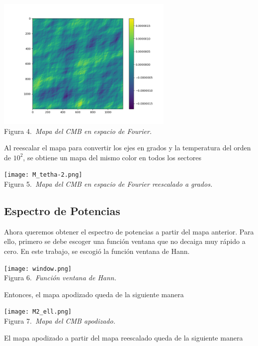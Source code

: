 \documentclass[twocolumn,letterpaper,spanish]{revtex4}
\numberwithin{equation}{section}
\begin{document}
\begin{center}
   \includegraphics[width=85mm]{M_tetha.png}\\
   Figura 4.\emph{\ Mapa del CMB en espacio de Fourier.}
\end{center}

Al reescalar el mapa para convertir los ejes en grados y la temperatura del orden de $10^2$, se obtiene un mapa del mismo color en todos los sectores

\begin{center}
   \texttt{[image: M\_tetha-2.png]}\\
   Figura 5.\emph{\ Mapa del CMB en espacio de Fourier reescalado a grados.}
\end{center}

\subsection{Espectro de Potencias}

Ahora queremos obtener el espectro de potencias a partir del mapa anterior. Para ello, primero se debe escoger una funci\'on ventana que no decaiga muy r\'apido a cero. En este trabajo, se escogi\'o la funci\'on ventana de Hann.

\begin{center}
   \texttt{[image: window.png]}\\
   Figura 6.\emph{\ Funci\'on ventana de Hann.}
\end{center}

Entonces, el mapa apodizado queda de la siguiente manera

\begin{center}
  \texttt{[image: M2\_ell.png]}\\
   Figura 7.\emph{\ Mapa del CMB apodizado.}
\end{center}

El mapa apodizado a partir del mapa reescalado queda de la siguiente manera
\end{document}

